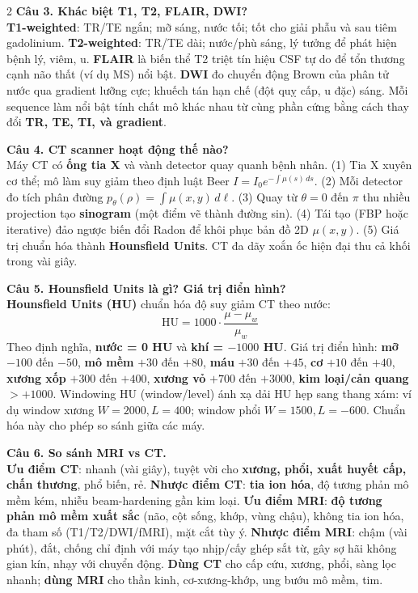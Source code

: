 \begin{paracol}{2}
\textbf{Câu 3. Khác biệt T1, T2, FLAIR, DWI?}\\
\textbf{T1-weighted}: TR/TE ngắn; mỡ sáng, nước tối; tốt cho giải phẫu và sau tiêm gadolinium. \textbf{T2-weighted}: TR/TE dài; nước/phù sáng, lý tưởng để phát hiện bệnh lý, viêm, u. \textbf{FLAIR} là biến thể T2 triệt tín hiệu CSF tự do để tổn thương cạnh não thất (ví dụ MS) nổi bật. \textbf{DWI} đo chuyển động Brown của phân tử nước qua gradient lưỡng cực; khuếch tán hạn chế (đột quỵ cấp, u đặc) sáng. Mỗi sequence làm nổi bật tính chất mô khác nhau từ cùng phần cứng bằng cách thay đổi \textbf{TR, TE, TI, và gradient}.

\textbf{Câu 4. CT scanner hoạt động thế nào?}\\
Máy CT có \textbf{ống tia X} và vành detector quay quanh bệnh nhân. (1) Tia X xuyên cơ thể; mô làm suy giảm theo định luật Beer $I = I_0 e^{-\int \mu(s)\,ds}$. (2) Mỗi detector đo tích phân đường $p_\theta(\rho) = \int \mu(x,y)\,d\ell$. (3) Quay từ $\theta=0$ đến $\pi$ thu nhiều projection tạo \textbf{sinogram} (một điểm vẽ thành đường sin). (4) Tái tạo (FBP hoặc iterative) đảo ngược biến đổi Radon để khôi phục bản đồ 2D $\mu(x,y)$. (5) Giá trị chuẩn hóa thành \textbf{Hounsfield Units}. CT đa dãy xoắn ốc hiện đại thu cả khối trong vài giây.

\textbf{Câu 5. Hounsfield Units là gì? Giá trị điển hình?}\\
\textbf{Hounsfield Units (HU)} chuẩn hóa độ suy giảm CT theo nước:
$$\mathrm{HU} = 1000 \cdot \frac{\mu - \mu_w}{\mu_w}$$
Theo định nghĩa, \textbf{nước = 0 HU} và \textbf{khí = $-1000$ HU}. Giá trị điển hình: \textbf{mỡ} $-100$ đến $-50$, \textbf{mô mềm} $+30$ đến $+80$, \textbf{máu} $+30$ đến $+45$, \textbf{cơ} $+10$ đến $+40$, \textbf{xương xốp} $+300$ đến $+400$, \textbf{xương vỏ} $+700$ đến $+3000$, \textbf{kim loại/cản quang} $> +1000$. Windowing HU (window/level) ánh xạ dải HU hẹp sang thang xám: ví dụ window xương $W=2000, L=400$; window phổi $W=1500, L=-600$. Chuẩn hóa này cho phép so sánh giữa các máy.

\textbf{Câu 6. So sánh MRI vs CT.}\\
\textbf{Ưu điểm CT}: nhanh (vài giây), tuyệt vời cho \textbf{xương, phổi, xuất huyết cấp, chấn thương}, phổ biến, rẻ. \textbf{Nhược điểm CT}: \textbf{tia ion hóa}, độ tương phản mô mềm kém, nhiễu beam-hardening gần kim loại. \textbf{Ưu điểm MRI}: \textbf{độ tương phản mô mềm xuất sắc} (não, cột sống, khớp, vùng chậu), không tia ion hóa, đa tham số (T1/T2/DWI/fMRI), mặt cắt tùy ý. \textbf{Nhược điểm MRI}: chậm (vài phút), đắt, chống chỉ định với máy tạo nhịp/cấy ghép sắt từ, gây sợ hãi không gian kín, nhạy với chuyển động. \textbf{Dùng CT} cho cấp cứu, xương, phổi, sàng lọc nhanh; \textbf{dùng MRI} cho thần kinh, cơ-xương-khớp, ung bướu mô mềm, tim.


\end{paracol}
